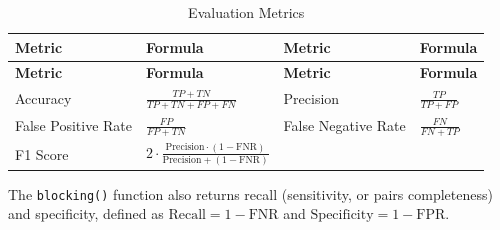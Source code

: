\begin{longtable}[]{@{}
  >{\raggedright\arraybackslash}p{}
  >{\raggedright\arraybackslash}p{}
  >{\raggedright\arraybackslash}p{}
  >{\raggedright\arraybackslash}p{}@{}}
\caption{\label{tab:eval-metrics} Evaluation Metrics}\tabularnewline
\toprule\noalign{}
\begin{minipage}[b]{\linewidth}\raggedright
\textbf{Metric}
\end{minipage} & \begin{minipage}[b]{\linewidth}\raggedright
\textbf{Formula}
\end{minipage} & \begin{minipage}[b]{\linewidth}\raggedright
\textbf{Metric}
\end{minipage} & \begin{minipage}[b]{\linewidth}\raggedright
\textbf{Formula}
\end{minipage} \\
\midrule\noalign{}
\endfirsthead
\toprule\noalign{}
\begin{minipage}[b]{\linewidth}\raggedright
\textbf{Metric}
\end{minipage} & \begin{minipage}[b]{\linewidth}\raggedright
\textbf{Formula}
\end{minipage} & \begin{minipage}[b]{\linewidth}\raggedright
\textbf{Metric}
\end{minipage} & \begin{minipage}[b]{\linewidth}\raggedright
\textbf{Formula}
\end{minipage} \\
\midrule\noalign{}
\endhead
\bottomrule\noalign{}
\endlastfoot
Accuracy & \(\frac{TP + TN}{TP + TN + FP + FN}\) & Precision & \(\frac{TP}{TP + FP}\) \\
False Positive Rate & \(\frac{FP}{FP + TN}\) & False Negative Rate & \(\frac{FN}{FN + TP}\) \\
F1 Score & \(2 \cdot \frac{\text{Precision} \cdot (1 - \text{FNR})}{\text{Precision} + (1 - \text{FNR})}\) & & \\
\end{longtable}

The \texttt{blocking()} function also returns recall (sensitivity, or pairs
completeness) and specificity, defined as
\(\text{Recall} = 1 - \text{FNR}\) and
\(\text{Specificity} = 1 - \text{FPR}\).

